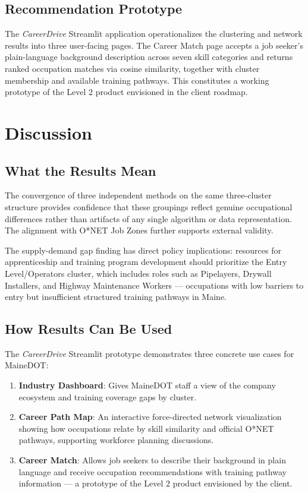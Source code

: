\documentclass[12pt]{article}
\begin{document}
\subsection{Recommendation Prototype}

The \textit{CareerDrive} Streamlit application operationalizes
the clustering and network results into three user-facing pages.
The Career Match page accepts a job seeker's plain-language
background description across seven skill categories and returns
ranked occupation matches via cosine similarity, together with
cluster membership and available training pathways. This
constitutes a working prototype of the Level 2 product envisioned
in the client roadmap.

\section{Discussion}

\subsection{What the Results Mean}

The convergence of three independent methods on the same
three-cluster structure provides confidence that these groupings
reflect genuine occupational differences rather than artifacts
of any single algorithm or data representation. The alignment
with O*NET Job Zones further supports external validity.

The supply-demand gap finding has direct policy implications:
resources for apprenticeship and training program development
should prioritize the Entry Level/Operators cluster, which
includes roles such as Pipelayers, Drywall Installers, and
Highway Maintenance Workers --- occupations with low barriers to
entry but insufficient structured training pathways in Maine.

\subsection{How Results Can Be Used}

The \textit{CareerDrive} Streamlit prototype demonstrates three
concrete use cases for MaineDOT:

\begin{enumerate}
    \item \textbf{Industry Dashboard}: Gives MaineDOT staff a
    view of the company ecosystem and training coverage gaps by
    cluster.
    \item \textbf{Career Path Map}: An interactive force-directed
    network visualization showing how occupations relate by skill
    similarity and official O*NET pathways, supporting workforce
    planning discussions.
    \item \textbf{Career Match}: Allows job seekers to describe
    their background in plain language and receive occupation
    recommendations with training pathway information --- a
    prototype of the Level 2 product envisioned by the client.
\end{enumerate}
\end{document}
